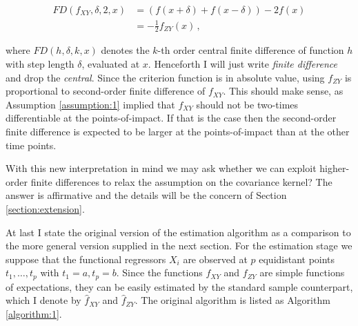 \begin{align*}
    FD(f_{XY}, \delta, 2, x) &= \left( f(x + \delta) + f(x - \delta) \right) - 2 f(x)\\
                             &= - \frac{1}{2} f_{ZY}(x) \,,
\end{align*}

where $FD(h, \delta, k, x)$ denotes the $k$-th order central finite difference of
function $h$ with step length $\delta$, evaluated at $x$. Henceforth I will just write
\emph{finite difference} and drop the \emph{central}. Since the criterion function is in
absolute value, using $f_{ZY}$ is proportional to second-order finite difference of
$f_{XY}$. This should make sense, as Assumption \ref{assumption:1} implied that $f_{XY}$
should not be two-times differentiable at the points-of-impact. If that is the case then
the second-order finite difference is expected to be larger at the points-of-impact than
at the other time points.


With this new interpretation in mind we may ask whether we can exploit higher-order
finite differences to relax the assumption on the covariance kernel? The answer is
affirmative and the details will be the concern of Section \ref{section:extension}.


At last I state the original version of the estimation algorithm as a comparison to the
more general version supplied in the next section. For the estimation stage we suppose
that the functional regressors $X_i$ are observed at $p$ equidistant points $t_1, \dots,
t_p$ with $t_1 = a, t_p = b$. Since the functions $f_{XY}$ and $f_{ZY}$ are simple
functions of expectations, they can be easily estimated by the standard sample
counterpart, which I denote by $\hat{f}_{XY}$ and $\hat{f}_{ZY}$. The original algorithm
is listed as Algorithm \ref{algorithm:1}.

